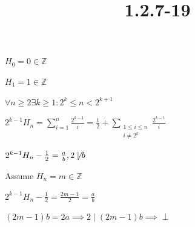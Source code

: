 \documentclass{article}
\title{1.2.7-19}
\begin{document}
\maketitle

$H_0 = 0 \in \mathbb{Z}$

$H_1 = 1 \in \mathbb{Z}$

$\forall n \geq 2 \exists k\geq 1: 2^k \leq n < 2^{k+1}$

$2^{k-1}H_n = \sum_{i=1}^n \frac{2^{k-1}}{i} = \frac{1}{2} + \sum_{\substack{1 \leq i \leq n\\ i \neq 2^k}} \frac{2^{k-1}}{i}$

$2^{k-1}H_n - \frac{1}{2} = \frac{a}{b}, 2 \not\mid b$

Assume $H_n = m \in \mathbb{Z}$

$2^{k-1}H_n - \frac{1}{2} = \frac{2m-1}{2} = \frac{a}{b}$

$(2m-1)b = 2a \implies 2 \mid (2m-1)b \implies \perp$
\end{document}
